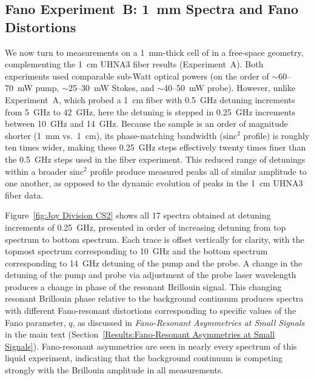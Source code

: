\FloatBarrier

\subsection{Fano Experiment~B: \SI{1}{\milli\meter} \texorpdfstring{}{CS2} Spectra and Fano Distortions}
\label{Appendix:Fano:Experiment B}

We now turn to measurements on a \SI{1}{\milli\meter}-thick cell of  in a free-space geometry, complementing the \SI{1}{\centi\meter} \ac{UHNA3} fiber results (Experiment~A). Both experiments used comparable sub-Watt optical powers (on the order of \(\sim\)60–\SI{70}{\milli\watt} pump, \(\sim\)25–\SI{30}{\milli\watt} Stokes, and \(\sim\)40–\SI{50}{\milli\watt} probe). However, unlike Experiment~A, which probed a \SI{1}{\centi\meter} fiber with \SI{0.5}{\giga\hertz} detuning increments from \SI{5}{\giga\hertz} to \SI{42}{\giga\hertz}, here the detuning is stepped in \SI{0.25}{\giga\hertz} increments between \SI{10}{\giga\hertz} and \SI{14}{\giga\hertz}. Because the  sample is an order of magnitude shorter (\SI{1}{\milli\meter} vs.\ \SI{1}{\centi\meter}), its phase-matching bandwidth (\(\mathrm{sinc}^{2}\) profile) is roughly ten times wider, making these \SI{0.25}{\giga\hertz} steps effectively twenty times finer than the \SI{0.5}{\giga\hertz} steps used in the fiber experiment. This reduced range of detunings within a broader \(\mathrm{sinc^2}\) profile produce measured peaks all of similar amplitude to one another, as opposed to the dynamic evolution of peaks in the \SI{1}{\centi\meter} \ac{UHNA3} fiber data.

Figure~\ref{fig:Joy Division CS2} shows all 17 spectra obtained at detuning increments of \SI{0.25}{\giga\hertz}, presented in order of increasing detuning from top spectrum to bottom spectrum. Each trace is offset vertically for clarity, with the topmost spectrum corresponding to \SI{10}{\giga\hertz} and the bottom spectrum corresponding to \SI{14}{\giga\hertz} detuning of the pump and the probe. A change in the detuning of the pump and probe via adjustment of the probe laser wavelength produces a change in phase of the resonant Brillouin signal. This changing resonant Brillouin phase relative to the background continuum produces spectra with different Fano-resonant distortions corresponding to specific values of the Fano parameter, \(q\), as discussed in \textit{Fano-Resonant Asymmetries at Small Signals} in the main text (Section~\ref{Results:Fano-Resonant Asymmetries at Small Signals}). Fano-resonant asymmetries are seen in nearly every spectrum of this liquid experiment, indicating that the background continuum is competing strongly with the Brillouin amplitude in all measurements.

